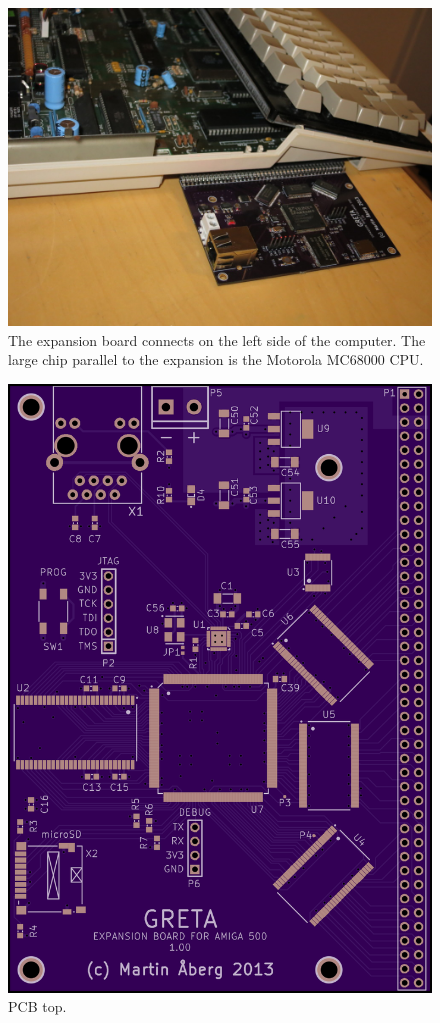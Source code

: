 \documentclass[a4paper]{report}
\begin{document}
\begin{figure}
\centering
\includegraphics[width=\textwidth]{greta_connected2.jpg}
\caption{The expansion board connects on the left side of the
computer. The large chip parallel to the expansion is the Motorola
MC68000 CPU.}
\label{greta_connected2}
\end{figure}

\begin{figure}
\centering
\includegraphics[width=\textwidth]{greta_1_00_top.png}
\caption{PCB top.}
\label{greta_osh_top}
\end{figure}
\end{document}
